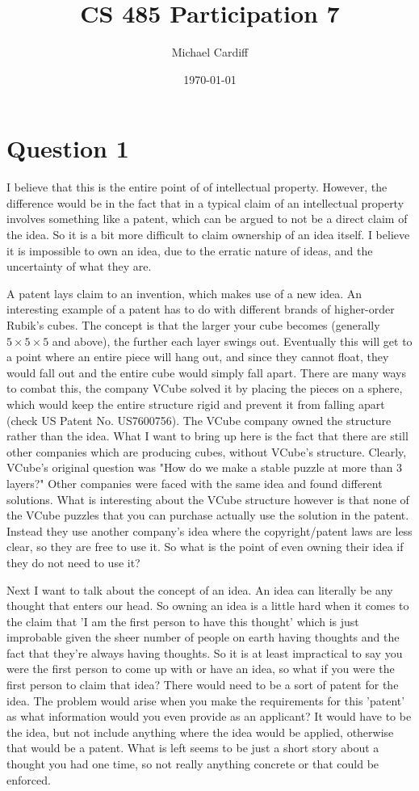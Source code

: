 \documentclass[12pt]{article}
\title{CS 485 Participation 7}
\author{Michael Cardiff}
\date{\today}
\begin{document}
\maketitle

\section*{Question 1}
I believe that this is the entire point of of intellectual property. However, the difference would be in the fact that in a typical claim of an intellectual property involves something like a patent, which can be argued to not be a direct claim of the idea. So it is a bit more difficult to claim ownership of an idea itself. I believe it is impossible to own an idea, due to the erratic nature of ideas, and the uncertainty of what they are.

A patent lays claim to an invention, which makes use of a new idea. An interesting example of a patent has to do with different brands of higher-order Rubik's cubes. The concept is that the larger your cube becomes (generally $5\times 5\times 5$ and above), the further each layer swings out. Eventually this will get to a point where an entire piece will hang out, and since they cannot float, they would fall out and the entire cube would simply fall apart. There are many ways to combat this, the company VCube solved it by placing the pieces on a sphere, which would keep the entire structure rigid and prevent it from falling apart (check US Patent No. US7600756). The VCube company owned the structure rather than the idea. What I want to bring up here is the fact that there are still other companies which are producing cubes, without VCube's structure. Clearly, VCube's original question was "How do we make a stable puzzle at more than 3 layers?" Other companies were faced with the same idea and found different solutions. What is interesting about the VCube structure however is that none of the VCube puzzles that you can purchase actually use the solution in the patent. Instead they use another company's idea where the copyright/patent laws are less clear, so they are free to use it. So what is the point of even owning their idea if they do not need to use it?

Next I want to talk about the concept of an idea. An idea can literally be any thought that enters our head. So owning an idea is a little hard when it comes to the claim that 'I am the first person to have this thought' which is just improbable given the sheer number of people on earth having thoughts and the fact that they're always having thoughts. So it is at least impractical to say you were the first person to come up with or have an idea, so what if you were the first person to claim that idea? There would need to be a sort of patent for the idea. The problem would arise when you make the requirements for this 'patent' as what information would you even provide as an applicant? It would have to be the idea, but not include anything where the idea would be applied, otherwise that would be a patent. What is left seems to be just a short story about a thought you had one time, so not really anything concrete or that could be enforced. 
\end{document}
